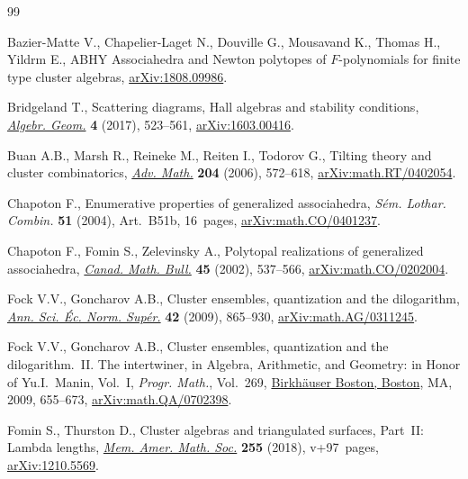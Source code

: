 \documentclass[pdftex]{sigma}
\numberwithin{equation}{section}
\begin{document}
%
%

\begin{thebibliography}{99}
\footnotesize\itemsep=0pt

Bazier-Matte V., Chapelier-Laget N., Douville G., Mousavand K., Thomas H.,
 Yildrm E., {ABHY} Associahedra and Newton polytopes of ${F}$-polynomials for
 finite type cluster algebras, \href{https://arxiv.org/abs/1808.09986}{arXiv:1808.09986}.

Bridgeland T., Scattering diagrams, {H}all algebras and stability conditions,
 \href{https://doi.org/10.14231/2017-027}{\textit{Algebr. Geom.}} \textbf{4} (2017), 523--561, \href{https://arxiv.org/abs/1603.00416}{arXiv:1603.00416}.

Buan A.B., Marsh R., Reineke M., Reiten I., Todorov G., Tilting theory and
 cluster combinatorics, \href{https://doi.org/10.1016/j.aim.2005.06.003}{\textit{Adv. Math.}} \textbf{204} (2006), 572--618,
 \href{https://arxiv.org/abs/math.RT/0402054}{arXiv:math.RT/0402054}.

Chapoton F., Enumerative properties of generalized associahedra, \textit{S\'em.
 Lothar. Combin.} \textbf{51} (2004), Art.~B51b, 16~pages,
 \href{https://arxiv.org/abs/math.CO/0401237}{arXiv:math.CO/0401237}.

Chapoton F., Fomin S., Zelevinsky A., Polytopal realizations of generalized
 associahedra, \href{https://doi.org/10.4153/CMB-2002-054-1}{\textit{Canad. Math. Bull.}} \textbf{45} (2002), 537--566,
 \href{https://arxiv.org/abs/math.CO/0202004}{arXiv:math.CO/0202004}.

Fock V.V., Goncharov A.B., Cluster ensembles, quantization and the dilogarithm,
 \href{https://doi.org/10.24033/asens.2112}{\textit{Ann. Sci. \'Ec. Norm. Sup\'er.}} \textbf{42} (2009), 865--930,
 \href{https://arxiv.org/abs/math.AG/0311245}{arXiv:math.AG/0311245}.

Fock V.V., Goncharov A.B., Cluster ensembles, quantization and the
 dilogarithm.~{II}. {T}he intertwiner, in Algebra, Arithmetic, and Geometry:
 in Honor of {Y}u.{I}.~{M}anin, {V}ol.~{I}, \textit{Progr. Math.}, Vol.~269,
 \href{https://doi.org/10.1007/978-0-8176-4745-2_15}{Birkh\"auser Boston, Boston}, MA, 2009, 655--673,
 \href{https://arxiv.org/abs/math.QA/0702398}{arXiv:math.QA/0702398}.

Fomin S., Thurston D., Cluster algebras and triangulated surfaces, {P}art~{II}:
 {L}ambda lengths, \href{https://doi.org/10.1090/memo/1223}{\textit{Mem. Amer. Math. Soc.}} \textbf{255} (2018),
 v+97~pages, \href{https://arxiv.org/abs/1210.5569}{arXiv:1210.5569}.


\end{thebibliography}
\end{document}
